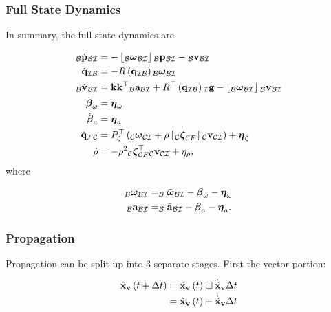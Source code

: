 \documentclass{beamer}
\begin{document}
\begin{frame}
\frametitle{Full State Dynamics}
In summary, the full state dynamics are

\begin{align}
_{\mathcal{B}}\dot{{\bf p}}_{\mathcal{B}\mathcal{I}} & =-\left\lfloor _{\mathcal{B}}\boldsymbol{\omega}_{\mathcal{B}\mathcal{I}}\right\rfloor {}_{\mathcal{B}}{\bf p}_{\mathcal{B}\mathcal{I}}-{}_{\mathcal{B}}{\bf v}_{\mathcal{B}\mathcal{I}}\\
\dot{{\bf q}}_{\mathcal{I}\mathcal{B}} & =-R\left({\bf q}_{\mathcal{I}\mathcal{B}}\right){}_{\mathcal{B}}\boldsymbol{\omega}_{\mathcal{B}\mathcal{I}}\\
_{\mathcal{B}}\dot{{\bf v}}_{\mathcal{B}\mathcal{I}} & ={\bf k}{\bf k}^{\top}{}_{\mathcal{B}}{\bf a}_{\mathcal{B}\mathcal{I}}+R^{\top}\left({\bf q}_{\mathcal{I}\mathcal{B}}\right){}_{\mathcal{I}}{\bf g}-\left\lfloor _{\mathcal{B}}\boldsymbol{\omega}_{\mathcal{B}\mathcal{I}}\right\rfloor {}_{\mathcal{B}}{\bf v}_{\mathcal{B}\mathcal{I}}\\
\dot{\boldsymbol{\beta}}_{\omega} & =\boldsymbol{\eta}_{\omega}\\
\dot{\boldsymbol{\beta}}_{a} & =\boldsymbol{\eta}_{a}\\
\dot{{\bf q}}_{\mathcal{F}\mathcal{C}} & =P_{\zeta}^{\top}\left(_{\mathcal{C}}\boldsymbol{\omega}_{\mathcal{C}\mathcal{I}}+\rho\left\lfloor _{\mathcal{C}}\boldsymbol{\zeta}_{\mathcal{C}F}\right\rfloor {}_{\mathcal{C}}{\bf v}_{\mathcal{C}\mathcal{I}}\right)+\boldsymbol{\eta}_{\zeta}\\
\dot{\rho} & =-\rho^{2}{}_{\mathcal{C}}\boldsymbol{\zeta}_{\mathcal{C}F}^{\top}{}_{\mathcal{C}}{\bf v}_{\mathcal{C}\mathcal{I}}+\eta_{\rho},
\end{align}
where

\begin{align}
_{\mathcal{B}}\boldsymbol{\omega}_{\mathcal{B}\mathcal{I}} & =_{\mathcal{B}}\bar{\boldsymbol{\omega}}_{\mathcal{B}\mathcal{I}}-\boldsymbol{\beta}_{\omega}-\boldsymbol{\eta}_{\omega}\\
_{\mathcal{B}}{\bf a}_{\mathcal{B}\mathcal{I}} & =_{\mathcal{B}}\bar{{\bf a}}_{\mathcal{B}\mathcal{I}}-\boldsymbol{\beta}_{a}-\boldsymbol{\eta}_{a}.
\end{align}
\end{frame}



\begin{frame}
\frametitle{Propagation}
Propagation can be split up into 3 separate stages. First the vector portion:

\begin{align}
\hat{{\bf x}}_{{\bf v}}\left(t+\Delta t\right) & =\hat{{\bf x}}_{{\bf v}}\left(t\right)\boxplus\dot{\hat{{\bf x}}}_{{\bf v}}\Delta t\\
 & =\hat{{\bf x}}_{{\bf v}}\left(t\right)+\dot{\hat{{\bf x}}}_{{\bf v}}\Delta t
\end{align}
\end{frame}
\end{document}
